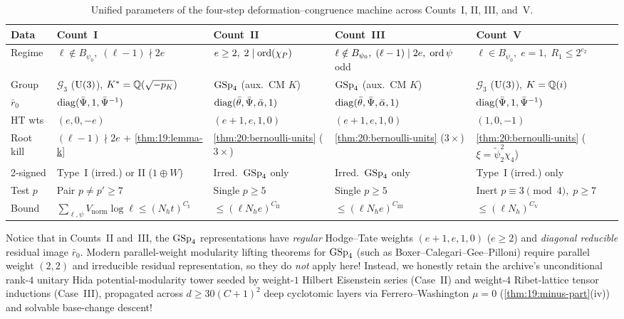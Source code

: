 \begin{table}[ht]
\centering
\caption{Unified parameters of the four-step deformation--congruence machine across Counts~I, II, III, and~V.}
\label{tab:20:four-counts}
\renewcommand{\arraystretch}{1.15}
\scriptsize
\begin{tabular}{@{}lllll@{}}
\toprule
\textbf{Data} & \textbf{Count~I} & \textbf{Count~II} & \textbf{Count~III} & \textbf{Count~V} \\
\midrule
Regime & $\ell \notin B_{\psi_0},\; (\ell-1)\nmid 2e$ & $e \ge 2,\; 2\mid\operatorname{ord}(\chi_P)$ & $\ell \notin B_{\psi_0},\; (\ell-1)\mid 2e,\; \operatorname{ord}\psi$ odd & $\ell \in B_{\psi_0},\; e=1,\; R_1 \le 2^{c_2}$ \\
Group & $\mathcal{G}_3$ ($\mathrm{U}(3)$), $K^* = \mathbb{Q}(\sqrt{-p_K})$ & $\mathrm{GSp}_4$ (aux.\ CM $K$) & $\mathrm{GSp}_4$ (aux.\ CM $K$) & $\mathcal{G}_3$ ($\mathrm{U}(3)$), $K = \mathbb{Q}(i)$ \\
$\bar{r}_0$ & $\operatorname{diag}(\bar{\Psi}, 1, \bar{\Psi}^{-1})$ & $\operatorname{diag}(\bar{\theta}, \bar{\Psi}, \bar{\alpha}, 1)$ & $\operatorname{diag}(\bar{\theta}, \bar{\Psi}, \bar{\alpha}, 1)$ & $\operatorname{diag}(\bar{\Psi}, 1, \bar{\Psi}^{-1})$ \\
HT wts & $(e, 0, -e)$ & $(e+1, e, 1, 0)$ & $(e+1, e, 1, 0)$ & $(1, 0, -1)$ \\
Root kill & $(\ell-1)\nmid 2e$ + \cref{thm:19:lemma-k} & \cref{thm:20:bernoulli-units} ($3\times$) & \cref{thm:20:bernoulli-units} ($3\times$) & \cref{thm:20:bernoulli-units} ($\xi = \widetilde{\psi}_2^2\chi_4$) \\
2-signed & Type~I (irred.) or II ($1\oplus W$) & Irred.\ $\mathrm{GSp}_4$ only & Irred.\ $\mathrm{GSp}_4$ only & Type~I (irred.) only \\
Test $p$ & Pair $p \neq p' \ge 7$ & Single $p \ge 5$ & Single $p \ge 5$ & Inert $p \equiv 3\pmod 4,\; p \ge 7$ \\
Bound & $\sum_{\ell, \psi} V_{\mathrm{norm}}\log\ell \le (N_h t)^{C_{\mathrm{I}}}$ & $\le (\ell N_h e)^{C_{\mathrm{II}}}$ & $\le (\ell N_h e)^{C_{\mathrm{III}}}$ & $\le (\ell N_h)^{C_{\mathrm{V}}}$ \\
\bottomrule
\end{tabular}
\end{table}

\begin{remark}
Notice that in Counts~II and~III, the $\mathrm{GSp}_4$ representations have \emph{regular} Hodge--Tate weights $(e+1, e, 1, 0)$ ($e \ge 2$) and \emph{diagonal reducible} residual image $\bar{r}_0$. Modern parallel-weight modularity lifting theorems for $\mathrm{GSp}_4$ (such as Boxer--Calegari--Gee--Pilloni) require parallel weight $(2, 2)$ and irreducible residual representation, so they do \emph{not} apply here! Instead, we honestly retain the archive's unconditional rank-$4$ unitary Hida potential-modularity tower seeded by weight-$1$ Hilbert Eisenstein series (Case~II) and weight-$4$ Ribet-lattice tensor inductions (Case~III), propagated across $d \ge 30(C+1)^2$ deep cyclotomic layers via Ferrero--Washington $\mu = 0$ (\cref{thm:19:minus-part}(iv)) and solvable base-change descent!
\end{remark}

